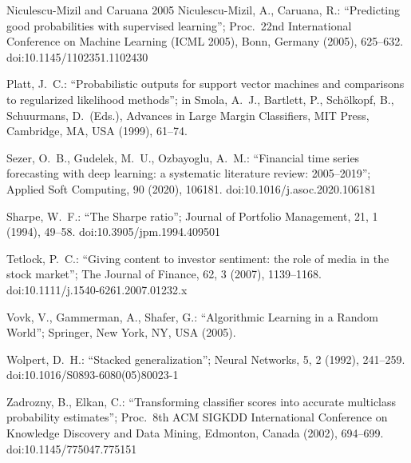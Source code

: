 \documentclass[10pt, a4paper, oneside]{article}
\theoremstyle{definition}
\theoremstyle{plain}
\begin{document}
{\begin{thebibliography}{Niculescu-Mizil and Caruana 2005}
Niculescu-Mizil, A., Caruana, R.: ``Predicting good probabilities with supervised
learning''; Proc.\ 22nd International Conference on Machine Learning (ICML 2005),
Bonn, Germany (2005), 625--632. doi:10.1145/1102351.1102430

Platt, J.\ C.: ``Probabilistic outputs for support vector machines and comparisons to
regularized likelihood methods''; in Smola, A.\ J., Bartlett, P., Sch\"olkopf, B.,
Schuurmans, D.\ (Eds.), Advances in Large Margin Classifiers, MIT Press, Cambridge,
MA, USA (1999), 61--74.

Sezer, O.\ B., Gudelek, M.\ U., Ozbayoglu, A.\ M.: ``Financial time series forecasting
with deep learning: a systematic literature review: 2005--2019''; Applied Soft
Computing, 90 (2020), 106181. doi:10.1016/j.asoc.2020.106181

Sharpe, W.\ F.: ``The Sharpe ratio''; Journal of Portfolio Management, 21, 1 (1994),
49--58. doi:10.3905/jpm.1994.409501

Tetlock, P.\ C.: ``Giving content to investor sentiment: the role of media in the stock
market''; The Journal of Finance, 62, 3 (2007), 1139--1168.
doi:10.1111/j.1540-6261.2007.01232.x

Vovk, V., Gammerman, A., Shafer, G.: ``Algorithmic Learning in a Random World'';
Springer, New York, NY, USA (2005).

Wolpert, D.\ H.: ``Stacked generalization''; Neural Networks, 5, 2 (1992), 241--259.
doi:10.1016/S0893-6080(05)80023-1

Zadrozny, B., Elkan, C.: ``Transforming classifier scores into accurate multiclass
probability estimates''; Proc.\ 8th ACM SIGKDD International Conference on Knowledge
Discovery and Data Mining, Edmonton, Canada (2002), 694--699.
doi:10.1145/775047.775151

\end{thebibliography}
\par}
\end{document}
